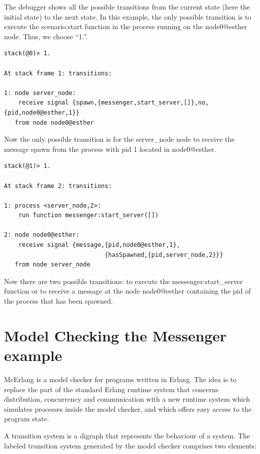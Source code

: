 \documentclass[a4paper]{article}
\begin{document}
The debugger shows all the possible transitions from the current state
(here the initial state) to the next state. In this example, the only
possible transition is to execute the scenario:start function
in the process running on the node0@esther node. Thus, we
choose ``1.''.

\begin{verbatim}
stack(@0)> 1.

At stack frame 1: transitions:

1: node server_node:
    receive signal {spawn,{messenger,start_server,[]},no,{pid,node0@esther,1}}
   from node node0@esther
\end{verbatim}

Now the only possible transition is for the server\_node node to receive the message spawn from the process with pid 1 located in node0@esther.

\begin{verbatim}
stack(@1)> 1.

At stack frame 2: transitions:

1: process <server_node,2>:
    run function messenger:start_server([])

2: node node0@esther:
    receive signal {message,{pid,node0@esther,1},
                            {hasSpawned,{pid,server_node,2}}}
   from node server_node
\end{verbatim}

Now there are two possible transitions: to execute the
messenger:start\_server function or to receive a message at the node
node0@esther containing the pid of the process that has been spawned.

\section{Model Checking the Messenger example}


McErlang is a model checker for programs written in Erlang. The idea
is to replace the part of the standard Erlang runtime system that
concerns distribution, concurrency and communication with a new
runtime system which simulates processes inside the model checker, and
which offers easy access to the program state. 

A transition system is a digraph that represents the behaviour of a
system. The labeled transition system generated by the model checker
comprises two elements:
\end{document}
